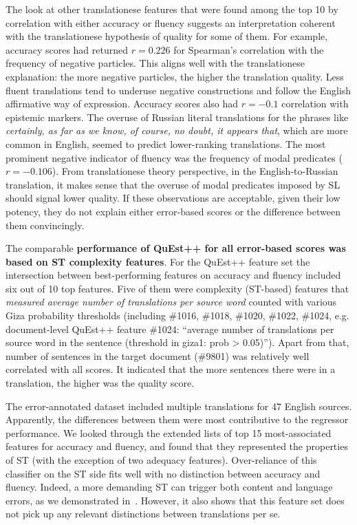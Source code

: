 \label{pg:errors_some_coherence_with_translationese_theory_of_quality}
The look at other translationese features that were found among the top 10 by correlation with either accuracy or fluency suggests an interpretation coherent with the translationese hypothesis of quality for some of them. 
For example, accuracy scores had returned $r=0.226$ for Spearman's correlation with the frequency of negative particles. This aligns well with the translationese explanation: the more negative particles, the higher the translation quality. Less fluent translations tend to underuse negative constructions and follow the English affirmative way of expression. Accuracy scores also had $r=-0.1$ correlation with epistemic markers. The overuse of Russian literal translations for the phrases like \textit{certainly, as far as we know, of course, no doubt, it appears that}, which are more common in English, seemed to predict lower-ranking translations. The most prominent negative indicator of fluency was the frequency of modal predicates ($r=-0.106$). From translationese theory perspective, in the English-to-Russian translation, it makes sense that the overuse of modal predicates imposed by SL should signal lower quality.
If these observations are acceptable, given their low potency, they do not explain either error-based scores or the difference between them convincingly.   

\label{pg:quest_feats4err}
The comparable \textbf{performance of QuEst++ for all error-based scores was based on ST complexity features}.
For the QuEst++ feature set the intersection between best-performing features on accuracy and fluency included six out of 10 top features. Five of them were complexity (ST-based) features that \textit{measured average number of translations per source word} counted with various Giza probability thresholds (including \#1016, \#1018, \#1020, \#1022, \#1024, e.g. document-level QuEst++ feature \#1024: ``average number of translations per source word in the sentence (threshold in giza1: prob > 0.05)''). Apart from that, number of sentences in the target document (\#9801) was relatively well correlated with all scores. It indicated that the more sentences there were in a translation, the higher was the quality score.

The error-annotated dataset included multiple translations for 47 English sources. Apparently, the differences between them were most contributive to the regressor performance. We looked through the extended lists of top 15 most-associated features for accuracy and fluency, and found that they represented the properties of ST (with  the exception of two adequacy features). Over-reliance of this classifier on the ST side fits well with no distinction between accuracy and fluency. Indeed, a more demanding ST can trigger both content and language errors, as we demonstrated in~\cite{Kunilovskaya2022err}.
However, it also shows that this feature set does not pick up any relevant distinctions between translations per se. 

